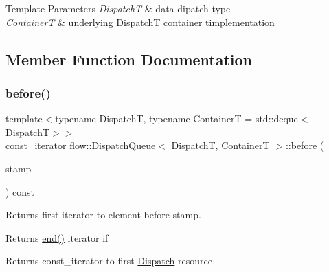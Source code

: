 \begin{DoxyTemplParams}{Template Parameters}
{\em DispatchT} & data dipatch type \\
\hline
{\em ContainerT} & underlying {\ttfamily DispatchT} container timplementation \\
\hline
\end{DoxyTemplParams}


\subsection{Member Function Documentation}
\mbox{\label{classflow_1_1_dispatch_queue_a0d73fa057b183d363c7da2871c34e0ba}} 
\subsubsection{\texorpdfstring{before()}{before()}}
{\footnotesize\ttfamily template$<$typename DispatchT, typename ContainerT = std\+::deque$<$\+Dispatch\+T$>$$>$ \\
\hyperlink{classflow_1_1_dispatch_queue_a307496fdc34a2d59e11114dabf85dc8a}{const\+\_\+iterator} \hyperlink{classflow_1_1_dispatch_queue}{flow\+::\+Dispatch\+Queue}$<$ DispatchT, ContainerT $>$\+::before (\begin{DoxyParamCaption}\item[{\hyperlink{classflow_1_1_dispatch_queue_affc83531dc53ee147899a33e82a6cbf0}{stamp\+\_\+const\+\_\+arg\+\_\+type}}]{stamp }\end{DoxyParamCaption}) const\hspace{0.3cm}{\ttfamily [inline]}}



Returns first iterator to element before stamp. 

Returns {\ttfamily \hyperlink{classflow_1_1_dispatch_queue_a359b294ce203e10ee9fafc147f6638ff}{end()}} iterator if \begin{DoxyReturn}{Returns}
{\ttfamily const\+\_\+iterator} to first \hyperlink{classflow_1_1_dispatch}{Dispatch} resource 
\end{DoxyReturn}
\mbox{\label{classflow_1_1_dispatch_queue_a19612c628308b97497ffca62c9b2b420}} 
